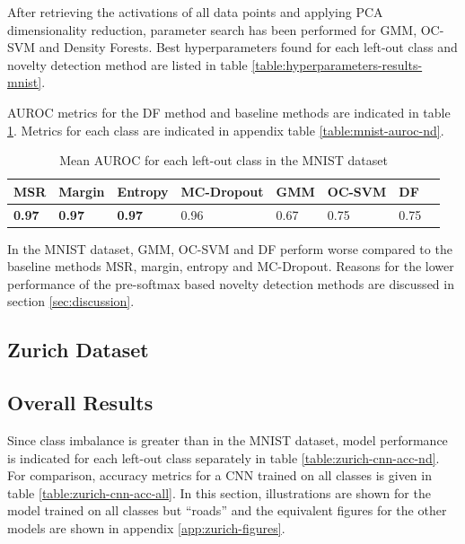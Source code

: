 \documentclass[10pt]{article}
\begin{document}
After retrieving the activations of all data points and applying \gls{PCA} dimensionality reduction, parameter search has been performed for \gls{GMM}, \gls{OC-SVM} and Density Forests. Best hyperparameters found for each left-out class and novelty detection method are listed in table \ref{table:hyperparameters-results-mnist}.

\gls{AUROC} metrics for the \acrlong{DF} method and baseline methods are indicated in table \ref{table:mnist-auroc-nd-mean}. Metrics for each class are indicated in appendix table \ref{table:mnist-auroc-nd}.

\begin{table}[H]
    \centering
    \begin{tabular}{@{}llllllll@{}}
    \toprule
     \gls{MSR}  & Margin & Entropy & \gls{MC-Dropout} & \gls{GMM} & \gls{OC-SVM}  & \gls{DF} \\ \midrule
    \textbf{0.97} & \textbf{0.97} & \textbf{0.97} & 0.96 & 0.67 & 0.75 & 0.75 \\\bottomrule
    \end{tabular}
    \caption{Mean \gls{AUROC} for each left-out class in the MNIST dataset}
    \label{table:mnist-auroc-nd-mean}
\end{table}

In the MNIST dataset, \gls{GMM}, \gls{OC-SVM} and \gls{DF} perform worse compared to the baseline methods \gls{MSR}, margin, entropy and \gls{MC-Dropout}. Reasons for the lower performance of the pre-softmax based novelty detection methods are discussed in section \ref{sec:discussion}.


\subsection{Zurich Dataset}
\label{subsec:results-zurich}

\subsection{Overall Results}
Since class imbalance is greater than in the MNIST dataset, model performance is indicated for each left-out class separately in table \ref{table:zurich-cnn-acc-nd}. For comparison, accuracy metrics for a \gls{CNN} trained on all classes is given in table \ref{table:zurich-cnn-acc-all}. In this section, illustrations are shown for the model trained on all classes but ``roads'' and the equivalent figures for the other models are shown in appendix \ref{app:zurich-figures}.
\end{document}
